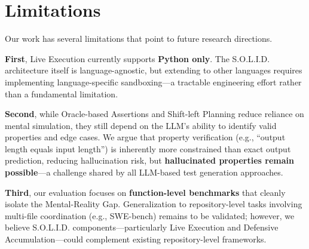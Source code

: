 \documentclass[11pt]{article}
\begin{document}
\section*{Limitations}

Our work has several limitations that point to future research directions.

\textbf{First}, Live Execution currently supports \textbf{Python only}. The S.O.L.I.D. architecture itself is language-agnostic, but extending to other languages requires implementing language-specific sandboxing---a tractable engineering effort rather than a fundamental limitation.

\textbf{Second}, while Oracle-based Assertions and Shift-left Planning reduce reliance on mental simulation, they still depend on the LLM's ability to identify valid properties and edge cases. We argue that property verification (e.g., ``output length equals input length'') is inherently more constrained than exact output prediction, reducing hallucination risk, but \textbf{hallucinated properties remain possible}---a challenge shared by all LLM-based test generation approaches.

\textbf{Third}, our evaluation focuses on \textbf{function-level benchmarks} that cleanly isolate the Mental-Reality Gap. Generalization to repository-level tasks involving multi-file coordination (e.g., SWE-bench) remains to be validated; however, we believe S.O.L.I.D. components---particularly Live Execution and Defensive Accumulation---could complement existing repository-level frameworks.
\end{document}
